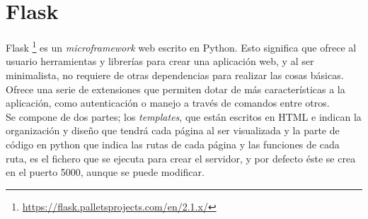 \section{Flask}
\label{sec:flask}
Flask \footnote{\url{https://flask.palletsprojects.com/en/2.1.x/}} es un \textit{microframework} web escrito en Python. Esto significa que ofrece al usuario herramientas y librerías para crear una aplicación web, y al ser minimalista, no requiere de otras dependencias para realizar las cosas básicas. Ofrece una serie de extensiones que permiten dotar de más características a la aplicación, como autenticación o manejo a través de comandos entre otros.\\
Se compone de dos partes; los \textit{templates}, que están escritos en HTML e indican la organización y diseño que tendrá cada página al ser visualizada y la parte de código en python que indica las rutas de cada página y las funciones de cada ruta, es el fichero que se ejecuta para crear el servidor, y por defecto éste se crea en el puerto 5000, aunque se puede modificar.\\

